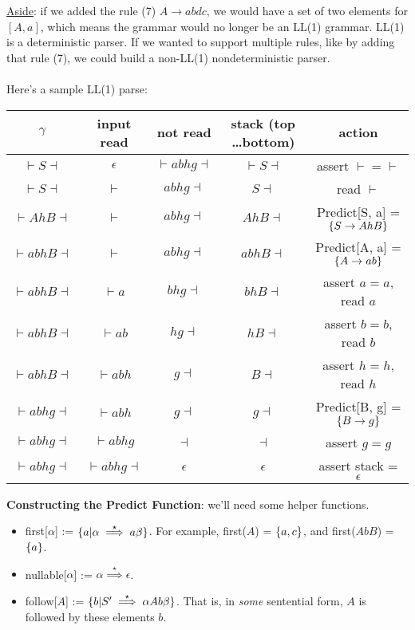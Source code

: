 \documentclass[]{article}
\DeclarePairedDelimiter{\set}{\lbrace}{\rbrace}
\theoremstyle{definition}
\begin{document}
				\underline{Aside}: if we added the rule (7) $A \to abdc$, we would have a set of two elements for $[A, a]$, which means the grammar would no longer be an LL(1) grammar. LL(1) is a deterministic parser. If we wanted to support multiple rules, like by adding that rule (7), we could build a non-LL(1) nondeterministic parser. 
				\\ \\
				Here's a sample LL(1) parse:
				\begin{center}
					\begin{tabular}{|c|c|c|c|c|}
						\hline
						$\gamma$ & input read & not read & stack (top \ldots bottom) & action \\ \hline
						$\vdash S \dashv$ & $\epsilon$ & $\vdash abhg \dashv$ & $\vdash S \dashv$ & assert $\vdash = \vdash$ \\
						$\vdash S \dashv$ & $\vdash$ & $abhg \dashv$ & $S \dashv$ & read $\vdash$ \\
						$\vdash AhB \dashv$ & $\vdash$ & $abhg \dashv$ & $AhB \dashv$ & Predict[S, a] = $\set{S \to AhB}$ \\
						$\vdash abhB \dashv$ & $\vdash$ & $abhg \dashv$ & $abhB \dashv$ & Predict[A, a] = $\set{A \to ab}$ \\
						$\vdash abhB \dashv$ & $\vdash a$ & $bhg \dashv$ & $bhB \dashv$ & assert $a = a$, read $a$ \\
						$\vdash abhB \dashv$ & $\vdash ab$ & $hg \dashv$ & $hB \dashv$ & assert $b = b$, read $b$ \\
						$\vdash abhB \dashv$ & $\vdash abh$ & $g \dashv$ & $B \dashv$ & assert $h = h$, read $h$ \\
						$\vdash abhg \dashv$ & $\vdash abh$ & $g \dashv$ & $g \dashv$ & Predict[B, g] = $\set{B \to g}$ \\
						$\vdash abhg \dashv$ & $\vdash abhg$ & $\dashv$ & $\dashv$ & assert $g = g$ \\
						$\vdash abhg \dashv$ & $\vdash abhg \dashv$ & $\epsilon$ & $\epsilon$ & assert stack = $\epsilon$ \\ \hline
					\end{tabular}
				\end{center}
	

				\textbf{Constructing the Predict Function}: we'll need some helper functions.
				\begin{itemize}
					\item first[$\alpha$] := $\set{a | \alpha \stackrel{\star}{\implies} a \beta}$. For example, first($A$) = $\set{a, c}$, and first($AbB$) = $\set{a}$.
					\item nullable[$\alpha$] := $\alpha \stackrel{\star}{\implies} \epsilon$.
					\item follow[$A$] := $\set{b | S' \stackrel{\star}{\implies} \alpha A b \beta}$. That is, in \emph{some} sentential form, $A$ is followed by these elements $b$.
				\end{itemize}
\end{document}
